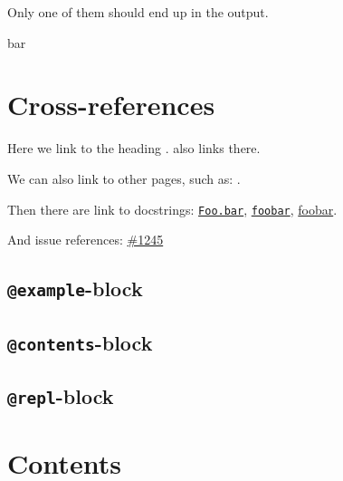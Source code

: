 Only one of them should end up in the output.






bar



\section{Cross-references}



\label{12734752257024730942}{}


Here we link to the heading .  also links there.



We can also link to other pages, such as: .



Then there are link to docstrings: \href{@ref}{\texttt{Foo.bar}}, \href{@ref Foo.bar}{\texttt{foobar}}, \href{@ref Foo.bar}{foobar}.



And issue references: \href{https://example.org/Repository.jl/blob/1245}{\#1245}



\subsection{\texttt{@example}-block}



\label{12317204655950454097}{}


\subsection{\texttt{@contents}-block}



\label{5495928211144802529}{}


\subsection{\texttt{@repl}-block}



\label{16839343392674353047}{}


\section{Contents}



